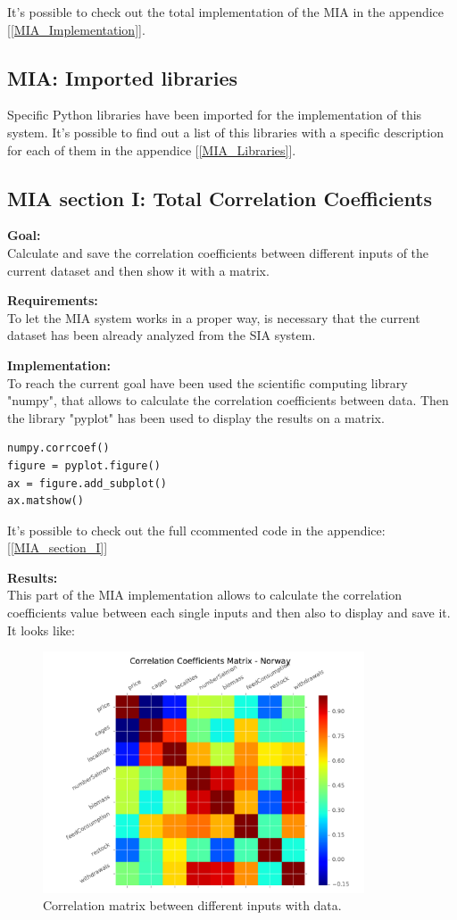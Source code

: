 It's possible to check out the total implementation of the MIA in the appendice  [\ref{MIA_Implementation}].

\subsection{MIA: Imported libraries}
Specific Python libraries have been imported for the implementation of this system.
It's possible to find out a list of this libraries with a specific description for each of them in the appendice [\ref{MIA_Libraries}].

\newpage

\subsection{MIA section I: Total Correlation Coefficients}
\textbf{Goal:}\\
Calculate and save the correlation coefficients between different inputs of the current dataset and then show it with a matrix.

\textbf{Requirements:}\\
To let the MIA system works in a proper way, is necessary that the current dataset has been already analyzed from the SIA system.

\textbf{Implementation:}\\
To reach the current goal have been used the scientific computing library "numpy", that allows to calculate the correlation coefficients between data. Then the library "pyplot" has been used to display the results on a matrix.
\begin{lstlisting}
numpy.corrcoef()
figure = pyplot.figure()
ax = figure.add_subplot()
ax.matshow()
\end{lstlisting}

It's possible to check out the full ccommented code in the appendice: [\ref{MIA_section_I}]

\textbf{Results:} \\
This part of the MIA implementation allows to calculate the correlation coefficients value between each single inputs and then also to display and save it. It looks like:

\begin{figure}[H]
	\centering
    \includegraphics[width=0.85\textwidth]{Files/Total_Dataset_Matrix.pdf}
    \caption{Correlation matrix between different inputs with data.}
\end{figure}

